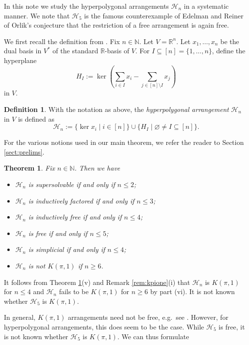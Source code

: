 \documentclass[12pt]{amsart}
\newcommand\CH{{\mathscr H}}
\newcommand\BBN{{\mathbb N}}
\newcommand\BBR{{\mathbb R}}
\numberwithin{equation}{section}
\theoremstyle{plain}
\newtheorem{theorem}[equation]{Theorem}
\theoremstyle{definition}
\newtheorem{defn}[equation]{Definition}
\begin{document}
In this note we study the hyperpolygonal arrangements $\CH_n$ in a systematic manner. 
We note that $\CH_5$
is the famous counterexample of Edelman and Reiner \cite{edelmanreiner:orlik} of Orlik's conjecture that the restriction of a free arrangement is again free. 

We first recall the definition from
\cite{bellamyetall:crepant}.
Fix $n \in \BBN$. Let $V = \BBR^n$. Let $x_1, \ldots, x_n$ be the dual basis  in $V^*$ of the standard $\BBR$-basis of $V$.
For $I \subseteq [n] = \{1, \ldots, n\}$, define the hyperplane
\[H_I 
:= \ker \left(\sum_{i \in I}x_i - \sum_{j \in [n]\setminus I}x_j\right)
\]
in $V$.

\begin{defn}
	\label{def:HA} 
	With the notation as above, the \emph{hyperpolygonal arrangement} $\CH_n$ in $V$ is defined as
	\[\CH_n := \{\ker x_i \mid i \in [n]\} \cup \{H_I \mid  \varnothing \neq I \subseteq [n]\}.
	\]
\end{defn}

For the various notions used in our main theorem, we refer the reader to Section \ref{sect:prelims}.

\begin{theorem}
	\label{thm:HA}
	Fix $n \in \BBN$. Then we have 
	\begin{itemize}
		\item[(i)]  $\CH_n$ is supersolvable if and only if $n\le 2$;
		\item[(ii)]  $\CH_n$ is inductively factored if and only if $n\le 3$;
		\item[(iii)]  $\CH_n$ is inductively free if and only if $n\le 4$;
		\item[(iv)] $\CH_n$ is free if and only if $n\le 5$;
		\item[(v)]  $\CH_n$ is simplicial if and only if $n\le 4$;
		\item[(vi)] $\CH_n$ is not $K(\pi,1)$ if $n\ge 6$.		
	\end{itemize}
\end{theorem}

It follows from Theorem \ref{thm:HA}(v) and Remark \ref{rem:kpione}(i) that $\CH_n$ is $K(\pi,1)$ for $n \le 4$ and $\CH_n$ fails to be  $K(\pi,1)$ for $n \ge 6$ by part (vi). It is not known whether $\CH_5$ is $K(\pi,1)$.

In general, $K(\pi,1)$ arrangements need not be free, e.g.~see \cite[Fig.~5.4]{orlikterao:arrangements}. However, for hyperpolygonal arrangements, this does seem to be the case.
While $\CH_5$ is free, it is not known whether $\CH_5$ is $K(\pi,1)$. We can thus formulate
\end{document}
